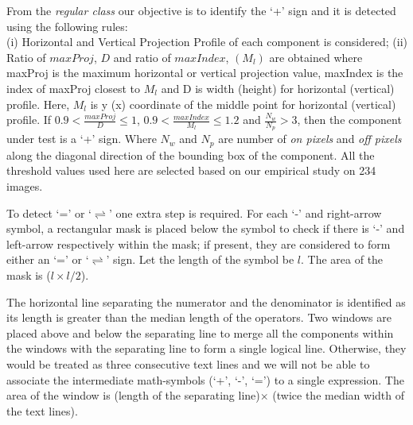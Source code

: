 \documentclass[conference]{IEEEtran}
\begin{document}
From the \emph{regular class} our objective is to identify the `+' sign
and it is detected using the following rules: \\
(i)  Horizontal and Vertical Projection Profile of each component is considered;
(ii) Ratio of  $maxProj$, $D$ and ratio of $maxIndex$, $(M_l)$
are obtained where maxProj is the maximum horizontal or vertical projection value, maxIndex is the index of maxProj closest to $M_l$ and D is width (height) for horizontal (vertical) profile. Here, $M_l$ is y (x) coordinate of the middle point for  horizontal (vertical) profile. 
If  $0.9 < \frac{maxProj}{D} \leq 1$,  $0.9 < \frac{maxIndex}{M_l} \leq 1.2$ and $\frac{N_w}{N_p} > 3$, then the component under test is a `+' sign.
Where $N_w$ and $N_p$ are number of \emph{on pixels} and \emph{off pixels} along the 
diagonal direction of the bounding box of the component. All the threshold values used  here are selected based on our empirical study on 234 images.

To detect `=' or `$\rightleftharpoons$' one extra step is
required. 
For each `-' and right-arrow  symbol, a rectangular mask is
placed below the symbol to check if there is `-' and left-arrow respectively within
the mask; if  present, they are considered to form either an `=' or
`$\rightleftharpoons$' sign. Let the length of the symbol
be $l$. The area of the mask is ($l \times l/2$). 

The horizontal line separating the numerator and the denominator
is identified as its length is greater than the median length of
the operators. Two windows are placed above and below the
separating line to merge all the components within the windows
with the separating line to form a single logical line.
Otherwise, they would be treated as three consecutive text lines
and we will not be able to associate the intermediate
math-symbols (‘+’, ‘-’, ‘=’) to a single expression. The area of
the window is (length of the separating line)$\times$ (twice the
median width of the text lines).
\end{document}
